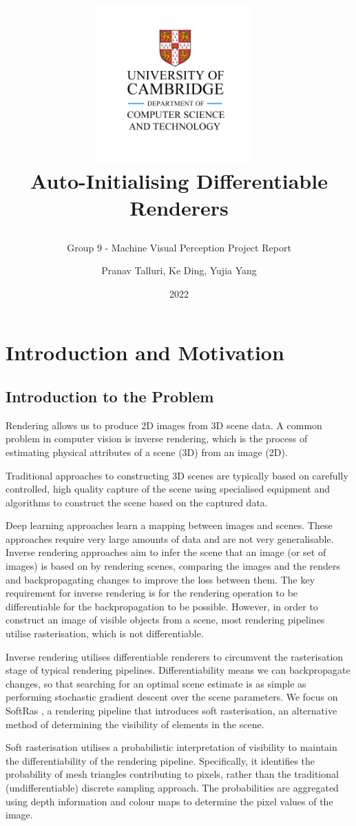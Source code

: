 \documentclass{article}
\subtitle{Group 9 - Machine Visual Perception Project Report}
\title{
    \begin{center}
    \includegraphics[width=0.45\textwidth]{cst.jpg}~
    \\[0.1cm]
    \Huge Auto-Initialising Differentiable Renderers
    \end{center}
}
\author{Pranav Talluri, Ke Ding, Yujia Yang}
\date{2022}
\begin{document}
\maketitle
\newpage
\tableofcontents
\newpage
\section{Introduction and Motivation}
\subsection{Introduction to the Problem}

Rendering allows us to produce 2D images from 3D scene data. A common problem in computer vision is inverse rendering, which is the process of estimating physical attributes of a scene (3D) from an image (2D).

Traditional approaches to constructing 3D scenes are typically based on carefully controlled, high quality capture of the scene using specialised equipment and algorithms to construct the scene based on the captured data. 

Deep learning approaches learn a mapping between images and scenes. These approaches require very large amounts of data and are not very generalisable.
Inverse rendering approaches aim to infer the scene that an image (or set of images) is based on by rendering scenes, comparing the images and the renders and backpropagating changes to improve the loss between them. The key requirement for inverse rendering is for the rendering operation to be differentiable for the backpropagation to be possible. However, in order to construct an image of visible objects from a scene, most rendering pipelines utilise rasterisation, which is not differentiable.

Inverse rendering utilises differentiable renderers to circumvent the rasterisation stage of typical rendering pipelines. Differentiability means we can backpropagate changes, so that searching for an optimal scene estimate is as simple as performing stochastic gradient descent over the scene parameters. We focus on SoftRas \parencite{softras}, a rendering pipeline that introduces soft rasterisation, an alternative method of determining the visibility of elements in the scene.

Soft rasterisation utilises a probabilistic interpretation of visibility to maintain the differentiability of the rendering pipeline. Specifically, it identifies the probability of mesh triangles contributing to pixels, rather than the traditional (undifferentiable) discrete sampling approach. The probabilities are aggregated using depth information and colour maps to determine the pixel values of the image.
\end{document}
